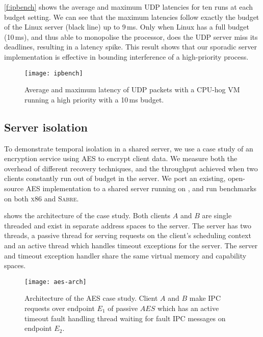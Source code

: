 \autoref{f:ipbench} shows the average and maximum \gls{UDP} latencies for
ten runs at each budget setting. We can see that the maximum latencies
follow exactly the budget of the Linux server (black line) up to 9\,ms. Only
when Linux has a full budget (10\,ms), and thus able to monopolise the
processor, does the UDP server miss its deadlines, resulting in a
latency spike.  This result shows that our sporadic server implementation is effective in bounding
interference of a high-priority process.

\begin{figure}[h]
  \centering
  \texttt{[image: ipbench]}
  \caption[Results of  isolation benchmark.]{Average and maximum latency of UDP packets with
  a CPU-hog VM running a high priority with a 10\,ms budget.}
  \label{f:ipbench}
\end{figure}

\subsection{Server isolation} 
\label{s:server-isolation}

To demonstrate temporal isolation in a shared server, we use a case study of an encryption service
using \gls{AES} to encrypt client data. We measure both the overhead of different
recovery techniques, and the throughput achieved when two clients constantly run out of budget in the server. 
We port an existing, open-source \gls{AES} implementation to a shared server running on \selfour, and run
benchmarks on both \textsc{x86} and \textsc{Sabre}.

 shows the architecture of the case study. Both clients $A$ and $B$ are single
 threaded and exist in separate address spaces to the server. The server has two threads, a passive
 thread for serving requests on the client's scheduling context and an active thread which handles
 timeout exceptions for the server. The server and timeout exception handler share the same virtual
 memory and capability spaces.

\begin{figure}
\centering
\texttt{[image: aes-arch]}
\caption[Architecture of the AES case study.]{Architecture of the \gls{AES} case study. Client $A$ and $B$ make \gls{IPC} requests over
endpoint $E_{1}$ of passive $AES$ which has an active timeout fault handling thread waiting for
fault \gls{IPC} messages on endpoint $E_{2}$.}
\label{f:aes-arch}
\end{figure}

